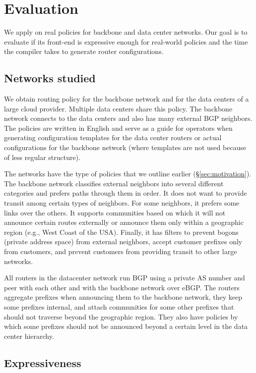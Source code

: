 \section{Evaluation}
\label{sec:evaluation}

We apply \sysname on real policies for backbone and data center networks. Our goal is to evaluate if its front-end is expressive enough for real-world policies and the time the compiler takes to generate router configurations.

\subsection{Networks studied}

We obtain routing policy for the backbone network and for the data centers of a large cloud provider. Multiple data centers share this policy. The backbone network connects to the data centers and also has many external BGP neighbors. The policies are written in English and serve as a guide for operators when generating configuration templates for the data center routers or actual configurations for the backbone network (where templates are not used because of less regular structure).

The networks have the type of policies that we outline earlier (\S\ref{sec:motivation}). The backbone network classifies external neighbors into several different categories and prefers paths through them in order. It does not want to provide transit among certain types of neighbors. For some neighbors, it prefers some links over the others. It supports communities based on which it will not announce certain routes externally or announce them only within a geographic region (e.g., West Coast of the USA). Finally, it has filters to prevent bogons (private address space) from external neighbors, accept customer prefixes only from customers, and prevent customers from providing transit to other large networks.

All routers in the datacenter network run BGP using a private AS number and peer with each other and with the backbone network over eBGP. The routers aggregate prefixes when announcing them to the backbone network, they keep some prefixes internal, and attach communities for some other prefixes that should not traverse beyond the geographic region. They also have policies by which some prefixes should not be announced beyond a certain level in the data center hierarchy.

\subsection{Expressiveness}

